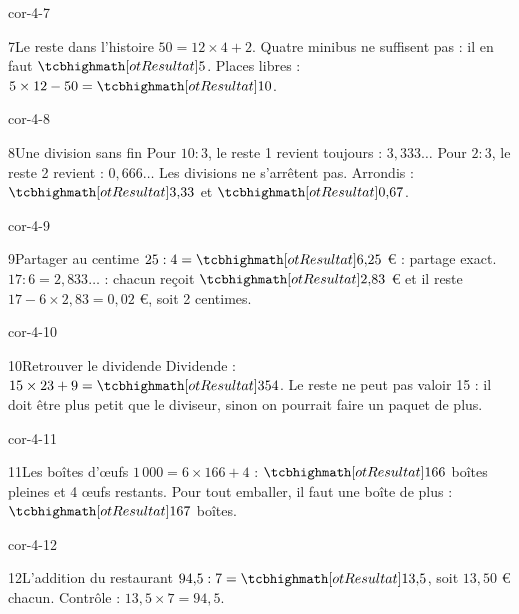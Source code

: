 \begin{blocLivre}{cor-4-7}\begin{corrige}{7}{Le reste dans l’histoire}
$50=12\times4+2$. Quatre minibus ne suffisent pas : il en faut $\res5$. Places libres : $5\times12-50=\res{10}$.
\end{corrige}\end{blocLivre}
\begin{blocLivre}{cor-4-8}\begin{corrige}{8}{Une division sans fin}
Pour $10:3$, le reste 1 revient toujours : $3{,}333\ldots$ Pour $2:3$, le reste 2 revient : $0{,}666\ldots$ Les divisions ne s’arrêtent pas. Arrondis : $\res{3{,}33}$ et $\res{0{,}67}$.
\end{corrige}\end{blocLivre}
\begin{blocLivre}{cor-4-9}\begin{corrige}{9}{Partager au centime}
$25:4=\res{6{,}25}$ € : partage exact. $17:6=2{,}833\ldots$ : chacun reçoit $\res{2{,}83}$ € et il reste $17-6\times2{,}83=0{,}02$ €, soit 2 centimes.
\end{corrige}\end{blocLivre}
\begin{blocLivre}{cor-4-10}\begin{corrige}{10}{Retrouver le dividende}
Dividende : $15\times23+9=\res{354}$. Le reste ne peut pas valoir 15 : il doit être plus petit que le diviseur, sinon on pourrait faire un paquet de plus.
\end{corrige}\end{blocLivre}
\begin{blocLivre}{cor-4-11}\begin{corrige}{11}{Les boîtes d’œufs}
$1\,000=6\times166+4$ : $\res{166}$ boîtes pleines et 4 œufs restants. Pour tout emballer, il faut une boîte de plus : $\res{167}$ boîtes.
\end{corrige}\end{blocLivre}
\begin{blocLivre}{cor-4-12}\begin{corrige}{12}{L’addition du restaurant}
$94{,}5:7=\res{13{,}5}$, soit $13{,}50$ € chacun. Contrôle : $13{,}5\times7=94{,}5$.
\end{corrige}\end{blocLivre}
